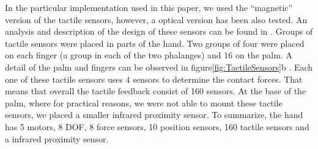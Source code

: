 In the particular implementation used in this paper, we used the
``magnetic'' version of the tactile sensors, however, a optical
version has been also tested. An analysis and description of the
design of these sensors can be found in \cite{etorresjSoft}.
Groups of tactile sensors were placed in parts of the hand. Two
groups of four were placed on each finger (a group in each of the
two phalanges) and 16 on the palm. A detail of the palm and
fingers can be observed in figure\ref{fig:TactileSensors}b . Each
one of these tactile sensors uses 4 sensors to determine the
contact forces. That means that overall the tactile feedback
consist of 160 sensors. At the base of the palm, where for
practical reasons, we were not able to mount these tactile
sensors, we placed a smaller infrared proximity sensor. To
summarize, the hand has 5 motors, 8 DOF, 8 force sensors, 10
position sensors, 160 tactile sensors and a infrared proximity
sensor.
